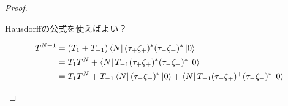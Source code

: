 {\begin{proof}
\begin{todo}[メモ]
			Hausdorffの公式を使えばよい？

			\begin{equation*}\begin{split}
				T^{N+1} &= (T_1 + T_{-1})
					\mathinner{\langle{N}|}(\tau_+\zeta_+)^*(\tau_-\zeta_+)^*\mathinner{|{0}\rangle} \\
				&= T_1T^N
					+ \mathinner{\langle{N}|}T_{-1}(\tau_+\zeta_+)^*(\tau_-\zeta_+)^* \mathinner{|{0}\rangle} \\
				&= T_1T^N + T_{-1}\mathinner{\langle{N}|}(\tau_-\zeta_+)^*\mathinner{|{0}\rangle}
					+ \mathinner{\langle{N}|}T_{-1}(\tau_+\zeta_+)^+(\tau_-\zeta_+)^* \mathinner{|{0}\rangle} \\
			\end{split}\end{equation*}
		\end{todo} %
	\end{proof} %

}

